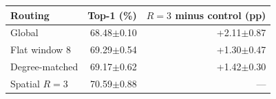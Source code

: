 \begin{tabular}{lrr}
\toprule
Routing & Top-1 (\%) & $R=3$ minus control (pp) \\
\midrule
Global & 68.48$\pm$0.10 & +2.11$\pm$0.87 \\
Flat window 8 & 69.29$\pm$0.54 & +1.30$\pm$0.47 \\
Degree-matched & 69.17$\pm$0.62 & +1.42$\pm$0.30 \\
Spatial $R=3$ & 70.59$\pm$0.88 & --- \\
\bottomrule
\end{tabular}
